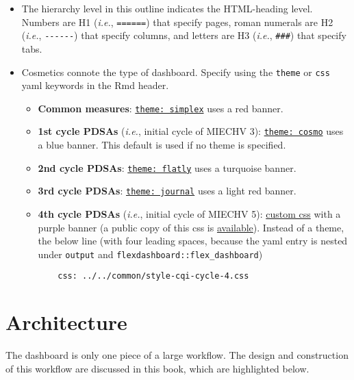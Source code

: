 \documentclass[
]{book}
\begin{document}
\begin{itemize}
\item
  The hierarchy level in this outline indicates the HTML-heading level. Numbers are H1 (\emph{i.e.}, \texttt{======}) that specify pages, roman numerals are H2 (\emph{i.e.}, \texttt{-\/-\/-\/-\/-\/-}) that specify columns, and letters are H3 (\emph{i.e.}, \texttt{\#\#\#}) that specify tabs.
\item
  Cosmetics connote the type of dashboard. Specify using the \texttt{theme} or \texttt{css} yaml keywords in the Rmd header.

  \begin{itemize}
  \item
    \textbf{Common measures}: \href{https://bootswatch.com/flatly/}{\texttt{theme:\ simplex}} uses a red banner.
  \item
    \textbf{1st cycle PDSAs} (\emph{i.e.}, initial cycle of MIECHV 3): \href{https://bootswatch.com/cosmo/}{\texttt{theme:\ cosmo}} uses a blue banner. This default is used if no theme is specified.
  \item
    \textbf{2nd cycle PDSAs}: \href{https://bootswatch.com/flatly/}{\texttt{theme:\ flatly}} uses a turquoise banner.
  \item
    \textbf{3rd cycle PDSAs}: \href{https://bootswatch.com/journal/}{\texttt{theme:\ journal}} uses a light red banner.
  \item
    \textbf{4th cycle PDSAs} (\emph{i.e.}, initial cycle of MIECHV 5): \href{https://github.com/OuhscBbmc/miechv-3/blob/master/analysis/common/style-cqi-cycle-4.css}{custom css} with a purple banner (a public copy of this css is \href{resources/example-dashboard/style-cqi-cycle-4.css}{available}). Instead of a theme, the below line (with four leading spaces, because the yaml entry is nested under \texttt{output} and \texttt{flexdashboard::flex\_dashboard})

\begin{verbatim}
    css: ../../common/style-cqi-cycle-4.css
\end{verbatim}
  \end{itemize}
\end{itemize}

\hypertarget{example-dashboard-architecture}{%
\section{Architecture}\label{example-dashboard-architecture}}

The dashboard is only one piece of a large workflow. The design and construction of this workflow are discussed in this book, which are highlighted below.
\end{document}
